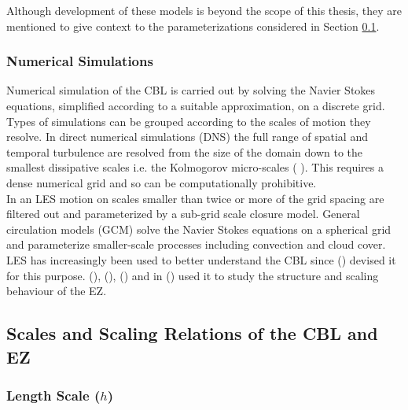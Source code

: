 Although development of these models is beyond the scope of this thesis, they are mentioned to give context to the parameterizations considered in Section \ref{subsec:scales}. \\         

\subsubsection{Numerical Simulations}
\label{subsec:}

Numerical simulation of the \acs{CBL} is carried out by solving the Navier Stokes equations, simplified according to a suitable approximation, on a discrete grid.  Types of simulations can be grouped according to the scales of motion they resolve.  In direct numerical simulations (\acs{DNS}) the full range of spatial and temporal turbulence are resolved from the size of the domain down to the smallest dissipative scales i.e. the Kolmogorov micro-scales (\citeauthor{Kolmog} \citeyear{Kolmog}).  This requires a dense numerical grid and so can be computationally prohibitive.\\

In an \acs{LES} motion on scales smaller than twice or more of the grid spacing are filtered out and parameterized by a sub-grid scale closure model. General circulation models (\acs{GCM}) solve the Navier Stokes equations on a spherical grid and parameterize smaller-scale processes including convection and cloud cover.  \acs{LES} has increasingly been used to better understand the \acs{CBL} since \citeauthor{Deardorff72} (\citeyear{Deardorff72}) devised it for this purpose.  \citeauthor{SullMoengStev} (\citeyear{SullMoengStev}), \citeauthor{FedConzMir04} (\citeyear{FedConzMir04}), \citeauthor{EbSchu} (\citeyear{EbSchu}) and \citeauthor{BrooksFowler2} in (\citeyear{BrooksFowler2}) used it to study the structure and scaling behaviour of the \acs{EZ}.\\

\subsection{Scales and Scaling Relations of the \acs{CBL} and \acs{EZ}}
\label{subsec:scales}

\subsubsection{Length Scale ($h$)}
\label{subsubsec:}

